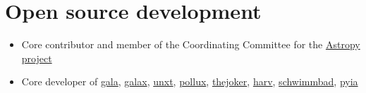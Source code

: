 \documentclass[12pt, letterpaper]{apw-cv}
\begin{document}
\begin{itemize}

\end{itemize}


\section*{Open source development \href{https://github.com/adrn}{\faGithub}}

\begin{itemize}

	\item Core contributor and member of the Coordinating Committee for the \href{http://www.astropy.org/}{Astropy project}
	\item Core developer of
        \href{http://gala.adrian.pw}{gala},
        \href{https://github.com/GalacticDynamics/galax}{galax},
        \href{https://github.com/GalacticDynamics/unxt}{unxt},
        \href{https://github.com/adrn/pollux}{pollux},
        \href{https://github.com/adrn/thejoker}{thejoker},
        \href{https://github.com/adrn/harv}{harv},
        \href{https://github.com/adrn/schwimmbad}{schwimmbad},
        \href{https://github.com/adrn/pyia}{pyia}

\end{itemize}
\end{document}

